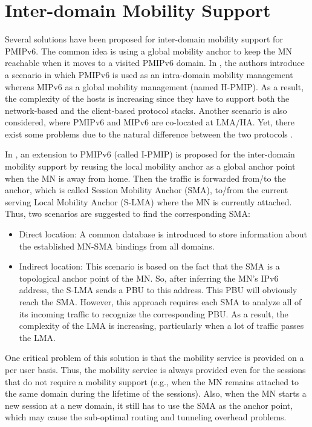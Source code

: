 \section{Inter-domain Mobility Support} \label{ch9:related_work}
Several solutions have been proposed for inter-domain mobility support for PMIPv6. The common idea is using a global mobility anchor to keep the MN reachable when it moves to a visited PMIPv6 domain. In \cite{rfc6612}, the authors introduce a scenario in which PMIPv6 is used as an intra-domain mobility management whereas MIPv6 as a global mobility management (named H-PMIP). As a result, the complexity of the hosts is increasing since they have to support both the network-based and the client-based protocol stacks. Another scenario is also considered, where PMIPv6 and MIPv6 are co-located at LMA/HA. Yet, there exist some problems due to the natural difference between the two protocols \cite{rfc6612}.  

In \cite{i-pmip}, an extension to PMIPv6 (called I-PMIP) is proposed for the inter-domain mobility support by reusing the local mobility anchor as a global anchor point when the MN is away from home. Then the traffic is forwarded from/to the anchor, which is called Session Mobility Anchor (SMA), to/from the current serving Local Mobility Anchor (S-LMA) where the MN is currently attached. Thus, two scenarios are suggested to find the corresponding SMA:
\begin{itemize}
\item Direct location: A common database is introduced to store information about the established MN-SMA bindings from all domains. 
\item Indirect location: This scenario is based on the fact that the SMA is a topological anchor point of the MN. So, after inferring the MN's IPv6 address, the S-LMA sends a PBU to this address. This PBU will obviously reach the SMA. However, this approach requires each SMA to analyze all of its incoming traffic to recognize the corresponding PBU. As a result, the complexity of the LMA is increasing, particularly when a lot of traffic passes the LMA.     
\end{itemize} 

One critical problem of this solution is that the mobility service is provided on a per user basis. Thus, the mobility service is always provided even for the sessions that do not require a mobility support (e.g., when the MN remains attached to the same domain during the lifetime of the sessions). Also, when the MN starts a new session at a new domain, it still has to use the SMA as the anchor point, which may cause the sub-optimal routing and tunneling overhead problems.

